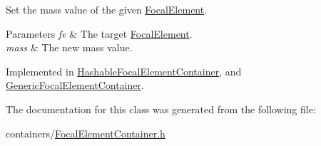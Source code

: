 Set the mass value of the given \hyperlink{classFocalElement}{Focal\+Element}. 


\begin{DoxyParams}{Parameters}
{\em fe} & The target \hyperlink{classFocalElement}{Focal\+Element}. \\
\hline
{\em mass} & The new mass value. \\
\hline
\end{DoxyParams}


Implemented in \hyperlink{classHashableFocalElementContainer_a16ac0c831312f31641aa716b19a3efed}{Hashable\+Focal\+Element\+Container}, and \hyperlink{classGenericFocalElementContainer_a33d167fa35d3e19ec214560c281681ea}{Generic\+Focal\+Element\+Container}.



The documentation for this class was generated from the following file\+:\begin{DoxyCompactItemize}
\item 
containers/\hyperlink{FocalElementContainer_8h}{Focal\+Element\+Container.\+h}\end{DoxyCompactItemize}
